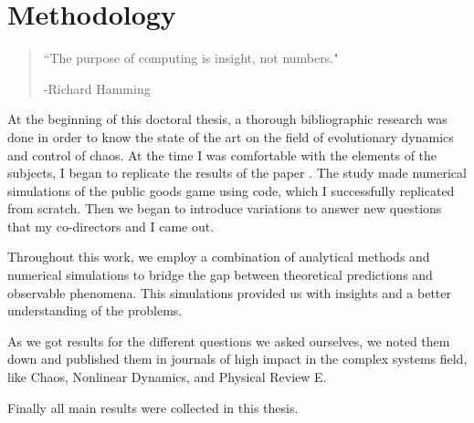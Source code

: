 \chapter{Methodology}
\label{chap:Method}


\begin{quotation}


	\vspace{-3cm}


    \begin{flushright}
    \begin{minipage}[t][5cm][b]{0.5\textwidth}
    { ``The purpose of computing is insight, not numbers."}
    
    \bigskip
    
    -{\small  Richard Hamming}
    \end{minipage}
    \end{flushright}
    
    \vspace{0.5cm}
\end{quotation}


At the beginning of this doctoral thesis, a thorough bibliographic research was done in order to know the state of the art on the field of evolutionary dynamics and control of chaos. At the time I was comfortable with the elements of the subjects, I began to replicate the results of the paper \cite{Replicate}. The study made numerical simulations of the public goods game using code, which I successfully replicated from scratch. Then we began to introduce variations to answer new questions that my co-directors and I came out.


Throughout this work, we employ a combination of analytical methods and numerical simulations to bridge the gap between theoretical predictions and observable phenomena. This simulations provided us with insights and a better understanding of the problems.

As we got results for the different questions we asked ourselves, we noted them down and published them in journals of high impact in the complex systems field, like Chaos, Nonlinear Dynamics, and Physical Review E.

Finally all main results were collected in this thesis.




\begin{thebibliography}{02}







\end{thebibliography}
